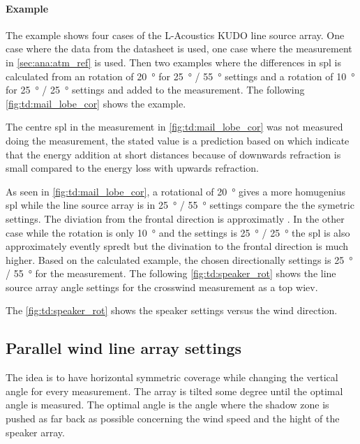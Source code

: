 \paragraph{Example} The example shows four cases of the L-Acoustics KUDO line source array. One case where the data from the datasheet is used, one case where the measurement in \autoref{sec:ana:atm_ref} is used. Then two examples where the differences in \gls{spl} is calculated from an rotation of \SI{20}{\degree} for \SI{25}{\degree} / \SI{55}{\degree} settings and a rotation of  \SI{10}{\degree} for \SI{25}{\degree} / \SI{25}{\degree} settings and added to the measurement. The following \autoref{fig:td:mail_lobe_cor} shows the example.



The centre \gls{spl} in the measurement in \autoref{fig:td:mail_lobe_cor} was not measured doing the measurement, the stated value is a prediction based on \citep{review_of_sound} which indicate that the energy addition at short distances because of downwards refraction is small compared to the energy loss with upwards refraction. 

As seen in \autoref{fig:td:mail_lobe_cor}, a rotational of \SI{20}{\degree} gives a more homugenius \gls{spl} while the line source array is in \SI{25}{\degree} / \SI{55}{\degree} settings compare the the symetric settings. The diviation from the frontal direction is approximatly . In the other case while the rotation is only \SI{10}{\degree} and the settings is \SI{25}{\degree} / \SI{25}{\degree} the \gls{spl} is also approximately evently spredt but the divination to the frontal direction is much higher. Based on the calculated example, the chosen directionally settings is \SI{25}{\degree} / \SI{55}{\degree} for the measurement. The following \autoref{fig:td:speaker_rot} shows the line source array angle settings for the crosswind measurement as a top wiev. 


The \autoref{fig:td:speaker_rot} shows the speaker settings versus the wind direction.

\subsection{Parallel wind line array settings}\label{sub:des:par_set}
The idea is to have horizontal symmetric coverage while changing the vertical angle for every measurement. The array is tilted some degree until the optimal angle is measured. The optimal angle is the angle where the shadow zone is pushed as far back as possible concerning the wind speed and the hight of the speaker array. 



